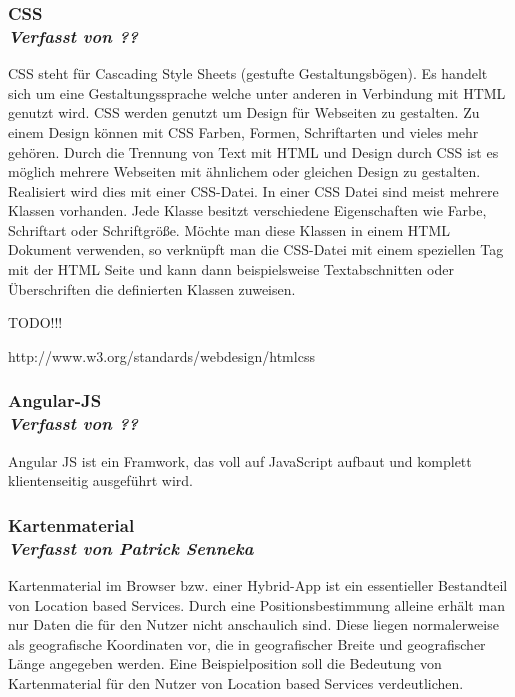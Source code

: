 \subsubsection[CSS]{CSS
 \\ \textnormal{\small{\textit {Verfasst von ??}}}}

CSS steht für Cascading Style Sheets (gestufte Gestaltungsbögen). Es handelt sich um eine Gestaltungssprache welche unter anderen in Verbindung mit HTML genutzt wird. CSS werden genutzt um Design für Webseiten zu gestalten. Zu einem Design können mit CSS Farben, Formen, Schriftarten und vieles mehr gehören. Durch die Trennung von Text mit HTML und Design durch CSS ist es möglich mehrere Webseiten mit ähnlichem oder gleichen Design zu gestalten. Realisiert wird dies mit einer CSS-Datei. In einer CSS Datei sind meist mehrere Klassen vorhanden. Jede Klasse besitzt verschiedene Eigenschaften wie Farbe, Schriftart oder Schriftgröße. Möchte man diese Klassen in einem HTML Dokument verwenden, so verknüpft man die CSS-Datei mit einem speziellen Tag mit der HTML Seite und kann dann beispielsweise Textabschnitten oder Überschriften die definierten Klassen zuweisen.

TODO!!!

http://www.w3.org/standards/webdesign/htmlcss

\subsubsection[Angular-JS]{Angular-JS
 \\ \textnormal{\small{\textit {Verfasst von ??}}}}
Angular JS ist ein Framwork, das voll auf JavaScript aufbaut und komplett klientenseitig ausgeführt wird.

\subsubsection[Kartenmaterial]{Kartenmaterial
 \\ \textnormal{\small{\textit {Verfasst von Patrick Senneka}}}}
 
Kartenmaterial im Browser bzw. einer Hybrid-App ist ein essentieller Bestandteil von Location based Services. Durch eine Positionsbestimmung alleine erhält man nur Daten die für den Nutzer nicht anschaulich sind. Diese liegen normalerweise als geografische Koordinaten vor, die in geografischer Breite und geografischer Länge angegeben werden. Eine Beispielposition soll die Bedeutung von Kartenmaterial für den Nutzer von Location based Services verdeutlichen.



